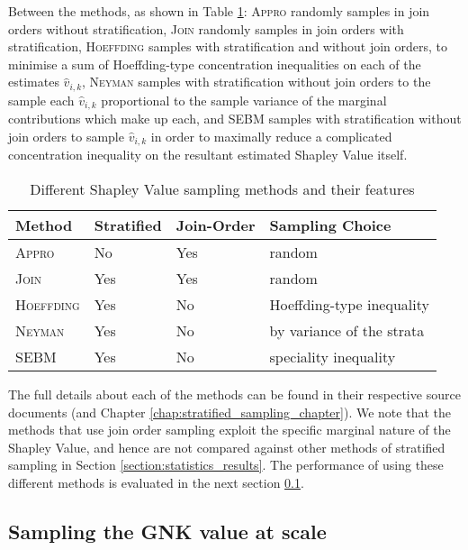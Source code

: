 Between the methods, as shown in Table \ref{table:stratified_sampling_methods}: \textsc{Appro} randomly samples in join orders without stratification, \textsc{Join} randomly samples in join orders with stratification, \textsc{Hoeffding} samples with stratification and without join orders, to minimise a sum of Hoeffding-type concentration inequalities on each of the estimates $\hat{v}_{i,k}$,
\textsc{Neyman} samples with stratification without join orders to the sample each $\hat{v}_{i,k}$ proportional to the sample variance of the marginal contributions which make up each,
and \textsc{SEBM} samples with stratification without join orders to sample $\hat{v}_{i,k}$ in order to maximally reduce a complicated concentration inequality on the resultant estimated Shapley Value itself.

\begin{table}[]
\centering
\begin{tabular}{|l|l|l|l|}
\hline
Method & Stratified & Join-Order & Sampling Choice \\ \hline
\textsc{Appro} & No & Yes & random\\
\textsc{Join} & Yes & Yes & random\\
\textsc{Hoeffding} & Yes & No & Hoeffding-type inequality \\
\textsc{Neyman} & Yes & No & by variance of the strata \\
\textsc{SEBM} & Yes & No & speciality inequality\\ \hline
\end{tabular}
\caption{Different Shapley Value sampling methods and their features}
\label{table:stratified_sampling_methods}
\end{table}

The full details about each of the methods can be found in their respective source documents \citep{CASTRO2017180,2013arXiv1306.4265M,DBLP:journals/cor/CastroGT09} (and Chapter \ref{chap:stratified_sampling_chapter}).
We note that the methods that use join order sampling exploit the specific marginal nature of the Shapley Value, and hence are not compared against other methods of stratified sampling in Section \ref{section:statistics_results}.
The performance of using these different methods is evaluated in the next section \ref{section:performance}.

\subsection{Sampling the GNK value at scale}\label{section:performance}

